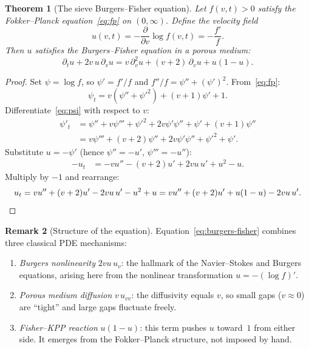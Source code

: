 \documentclass[11pt, a4paper]{amsart}
\theoremstyle{plain}
\newtheorem{theorem}{Theorem}[section]
\theoremstyle{definition}
\newtheorem{remark}[theorem]{Remark}
\begin{document}
\begin{theorem}[The sieve Burgers--Fisher equation]
\label{thm:burgers-fisher}
Let $f(v,t) > 0$ satisfy the Fokker--Planck equation~\eqref{eq:fp} on $(0,\infty)$.
Define the velocity field
\begin{equation}\label{eq:velocity}
u(v,t) = -\frac{\partial}{\partial v}\log f(v,t) = -\frac{f'}{f}.
\end{equation}
Then $u$ satisfies the Burgers--Fisher equation in a porous medium:
\begin{equation}\label{eq:burgers-fisher}
\boxed{\partial_t u + 2v\,u\,\partial_v u = v\,\partial_v^2 u + (v{+}2)\,\partial_v u + u(1{-}u).}
\end{equation}
\end{theorem}

\begin{proof}
Set $\psi = \log f$, so $\psi' = f'/f$ and $f''/f = \psi'' + (\psi')^2$.
From~\eqref{eq:fp}:
\begin{equation}\label{eq:psi}
\psi_t = v(\psi'' + \psi'^2) + (v+1)\psi' + 1.
\end{equation}
Differentiate~\eqref{eq:psi} with respect to $v$:
\begin{align*}
\psi'_t &= \psi'' + v\psi''' + \psi'^2 + 2v\psi'\psi'' + \psi' + (v+1)\psi'' \\
&= v\psi''' + (v+2)\psi'' + 2v\psi'\psi'' + \psi'^2 + \psi'.
\end{align*}
Substitute $u = -\psi'$ (hence $\psi'' = -u'$, $\psi''' = -u''$):
\begin{align*}
-u_t &= -vu'' - (v+2)u' + 2vu\,u' + u^2 - u.
\end{align*}
Multiply by $-1$ and rearrange:
\[
u_t = vu'' + (v+2)u' - 2vu\,u' - u^2 + u = vu'' + (v+2)u' + u(1-u) - 2vu\,u'. \qedhere
\]
\end{proof}

\begin{remark}[Structure of the equation]
Equation~\eqref{eq:burgers-fisher} combines three classical PDE mechanisms:
\begin{enumerate}
\item \emph{Burgers nonlinearity} $2vu\,u_v$: the hallmark of the Navier--Stokes and Burgers equations, 
arising here from the nonlinear transformation $u = -(\log f)'$.
\item \emph{Porous medium diffusion} $v\,u_{vv}$: the diffusivity equals $v$, so small gaps ($v \approx 0$) are ``tight'' 
and large gaps fluctuate freely.
\item \emph{Fisher--KPP reaction} $u(1{-}u)$: this term pushes $u$ toward~$1$ from either side. It emerges from the Fokker--Planck structure, not imposed by hand.
\end{enumerate}
\end{remark}
\end{document}
